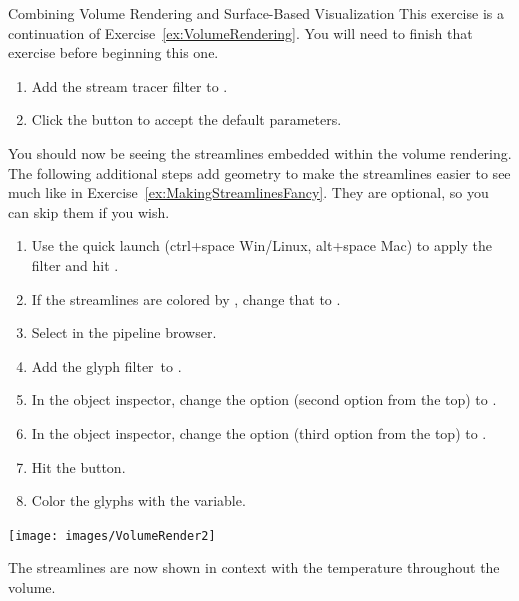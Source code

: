 \begin{exercise}{Combining Volume Rendering and Surface-Based Visualization}
  \label{ex:CombiningVolumeAndSurfaceRendering}%
  This exercise is a continuation of Exercise~\ref{ex:VolumeRendering}.
  You will need to finish that exercise before beginning this one.

  \begin{enumerate}
  \item Add the stream tracer filter \streamTracer to
    .
  \item Click the \apply button to accept the default parameters.
    \savecounter
  \end{enumerate}

  You should now be seeing the streamlines embedded within the volume
  rendering.  The following additional steps add geometry to make the
  streamlines easier to see much like in
  Exercise~\ref{ex:MakingStreamlinesFancy}.  They are optional, so you can
  skip them if you wish.

  \begin{enumerate}
    \restorecounter
  \item Use the quick launch (ctrl+space Win/Linux, alt+space Mac) to apply
    the  filter and hit \apply.
  \item If the streamlines are colored by , change that to
    .
  \item Select  in the pipeline browser.
  \item Add the glyph filter~\glyph to .
  \item In the object inspector, change the  option (second
    option from the top) to .
  \item In the object inspector, change the  option (third
    option from the top) to .
  \item Hit the \apply button.
  \item Color the glyphs with the  variable.
  \end{enumerate}

  \begin{inlinefig}
    \texttt{[image: images/VolumeRender2]}
  \end{inlinefig}

  The streamlines are now shown in context with the temperature throughout
  the volume.
\end{exercise}


